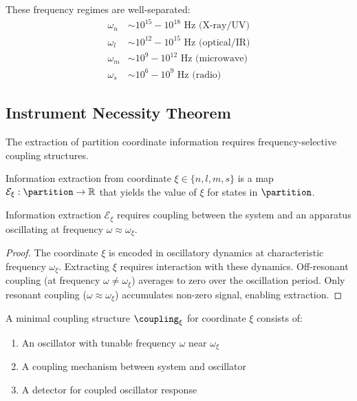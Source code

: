 These frequency regimes are well-separated:
\begin{align}
\omega_n &\sim 10^{15} - 10^{18} \text{ Hz (X-ray/UV)} \\
\omega_l &\sim 10^{12} - 10^{15} \text{ Hz (optical/IR)} \\
\omega_m &\sim 10^{9} - 10^{12} \text{ Hz (microwave)} \\
\omega_s &\sim 10^{6} - 10^{9} \text{ Hz (radio)}
\end{align}

\subsection{Instrument Necessity Theorem}

The extraction of partition coordinate information requires frequency-selective coupling structures.

\begin{definition}
\label{def:extraction}
Information extraction from coordinate $\xi \in \{n, l, m, s\}$ is a map $\mathcal{E}_\xi: \partition \to \mathbb{R}$ that yields the value of $\xi$ for states in $\partition$.
\end{definition}

\begin{theorem}
\label{thm:coupling_necessity}
Information extraction $\mathcal{E}_\xi$ requires coupling between the system and an apparatus oscillating at frequency $\omega \approx \omega_\xi$.
\end{theorem}

\begin{proof}
The coordinate $\xi$ is encoded in oscillatory dynamics at characteristic frequency $\omega_\xi$. Extracting $\xi$ requires interaction with these dynamics. Off-resonant coupling (at frequency $\omega \neq \omega_\xi$) averages to zero over the oscillation period. Only resonant coupling ($\omega \approx \omega_\xi$) accumulates non-zero signal, enabling extraction.
\end{proof}

\begin{definition}
\label{def:minimal_coupling}
A minimal coupling structure $\coupling_\xi$ for coordinate $\xi$ consists of:
\begin{enumerate}
\item An oscillator with tunable frequency $\omega$ near $\omega_\xi$
\item A coupling mechanism between system and oscillator
\item A detector for coupled oscillator response
\end{enumerate}
\end{definition}

